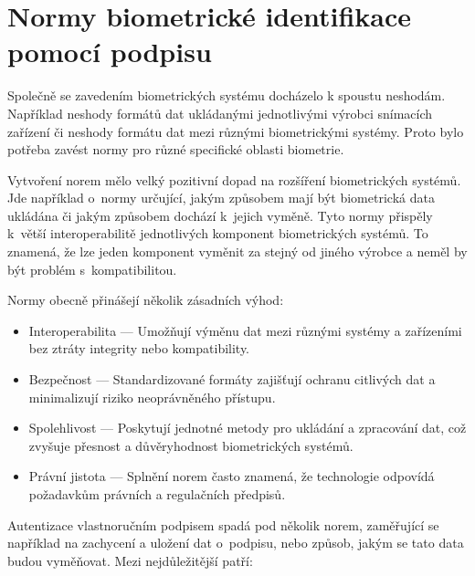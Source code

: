 \section{Normy biometrické identifikace pomocí podpisu}
Společně se zavedením biometrických systému docházelo k spoustu neshodám.
Například neshody formátů dat ukládanými jednotlivými výrobci snímacích zařízení či neshody formátu dat mezi různými biometrickými systémy.
Proto bylo potřeba zavést normy pro různé specifické oblasti biometrie.

Vytvoření norem mělo velký pozitivní dopad na rozšíření biometrických systémů.                                               %
Jde například o~normy určující, jakým způsobem mají být biometrická data ukládána či jakým způsobem dochází k~jejich vyměně. %
Tyto normy přispěly k~větší interoperabilitě jednotlivých komponent biometrických systémů.                                   %
To znamená, že lze jeden komponent vyměnit za stejný od jiného výrobce a neměl by být problém s~kompatibilitou.~\cite{DrahanskýMartin2011}%
\newline 

\noindent
Normy obecně přinášejí několik zásadních výhod:
\begin{itemize}
  \item Interoperabilita --- Umožňují výměnu dat mezi různými systémy a zařízeními bez ztráty integrity nebo kompatibility.
  \item Bezpečnost --- Standardizované formáty zajišťují ochranu citlivých dat a minimalizují riziko neoprávněného přístupu.
  \item Spolehlivost --- Poskytují jednotné metody pro ukládání a zpracování dat, což zvyšuje přesnost a důvěryhodnost biometrických systémů.
  \item Právní jistota --- Splnění norem často znamená, že technologie odpovídá požadavkům právních a regulačních předpisů.
\end{itemize}

Autentizace vlastnoručním podpisem spadá pod několik norem, zaměřující se například na zachycení a uložení dat o~podpisu, nebo způsob, jakým se tato data budou vyměňovat. 
Mezi nejdůležitější patří:


